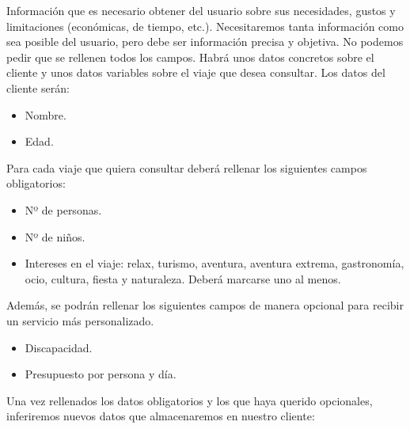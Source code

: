 \documentclass[11pt, a4paper, spanish, openright, twoside]{book}
\begin{document}
	\begin{section}{Información que es necesario obtener del usuario sobre sus necesidades, gustos y limitaciones (económicas, de tiempo, etc.).}
		Necesitaremos tanta información como sea posible del usuario, pero debe ser información precisa y objetiva. No podemos pedir que se 
		rellenen todos los campos. Habrá unos datos concretos sobre el cliente y unos datos variables sobre el viaje que desea consultar.
		Los datos del cliente serán:
		
				\begin{itemize}
					\item Nombre.
					\item Edad.									
				\end{itemize}
		
		Para cada viaje que quiera consultar deberá rellenar los siguientes campos obligatorios:
		
					\begin{itemize}
					\item Nº de personas.
					\item Nº de niños.
					\item Intereses en el viaje: relax, turismo, aventura, aventura extrema, gastronomía, ocio, cultura, fiesta y naturaleza. Deberá marcarse uno al menos.	
					
				\end{itemize}
		Además, se podrán rellenar los siguientes campos de manera opcional para recibir un servicio más personalizado.
		
				\begin{itemize}
					\item Discapacidad.
					\item Presupuesto por persona y día.	
				
				\end{itemize}
		Una vez rellenados los datos obligatorios y los que haya querido opcionales, inferiremos nuevos datos que almacenaremos en nuestro cliente:
		

\end{section}
\end{document}
